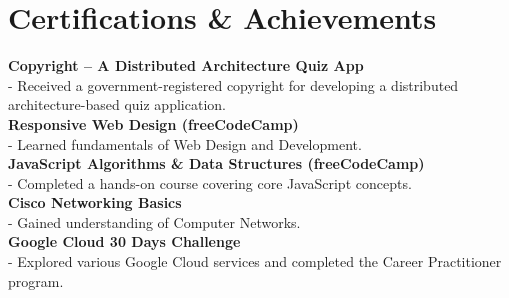 \documentclass[a4paper,10pt]{article}
\begin{document}
\section{Certifications \& Achievements}

\textbf{Copyright – A Distributed Architecture Quiz App} \\
- Received a government-registered copyright for developing a distributed architecture-based quiz application. \\[1ex]
\textbf{Responsive Web Design (freeCodeCamp)} \\
- Learned fundamentals of Web Design and Development. \\[1ex]
\textbf{JavaScript Algorithms \& Data Structures (freeCodeCamp)} \\
- Completed a hands-on course covering core JavaScript concepts. \\[1ex]
\textbf{Cisco Networking Basics} \\
- Gained understanding of Computer Networks. \\[1ex]
\textbf{Google Cloud 30 Days Challenge} \\
- Explored various Google Cloud services and completed the Career Practitioner program. \\[1ex]


\vfill
{}
\end{document}
